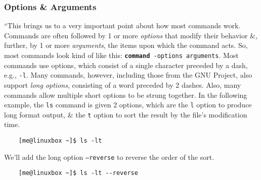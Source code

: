 \documentclass[oneside]{book}
\numberwithin{equation}{section}
\begin{document}
\subsubsection{Options \& Arguments}
``This brings us to a very important point about how most commands work. Commands are often followed by 1 or more \textit{options} that modify their behavior \&, further, by 1 or more \textit{arguments}, the items upon which the command acts. So, most commands look kind of like this: \texttt{\textbf{command} -options arguments}. Most commands use options, which consist of a single character preceded by a dash, e.g., \texttt{-l}. Many commands, however, including those from the GNU Project, also support \textit{long options}, consisting of a word preceded by 2 dashes. Also, many commands allow multiple short options to be strung together. In the following example, the \texttt{ls} command is given 2 options, which are the \texttt{l} option to produce long format output, \& the \texttt{t} option to sort the result by the file's modification time.
\begin{verbatim}
	[me@linuxbox ~]$ ls -lt
\end{verbatim}
We'll add the long option \texttt{--reverse} to reverse the order of the sort.
\begin{verbatim}
	[me@linuxbox ~]$ ls -lt --reverse
\end{verbatim}
\end{document}
